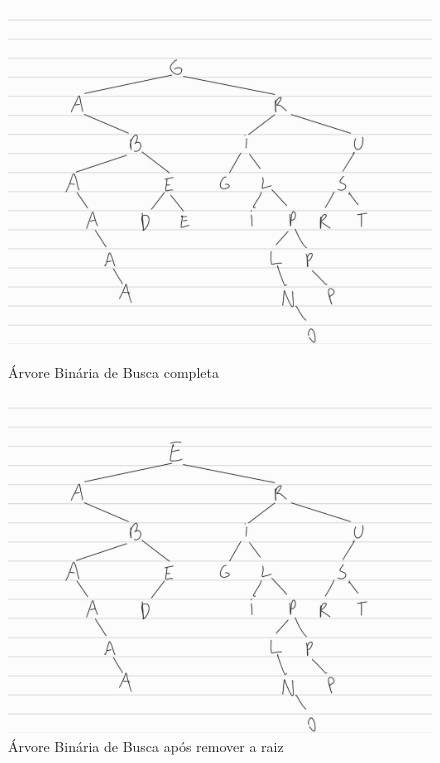 \documentclass{article}
\begin{document}
\begin{figure}[h!]
    \centering
    \begin{minipage}{0.45\linewidth}
        \centering
        \includegraphics[width=\linewidth]{arvoredebusca.jpg}
        \caption{Árvore Binária de Busca completa}
        \label{fig:arvorecompleta}
    \end{minipage}
    \hfill
    \begin{minipage}{0.45\linewidth}
        \centering
        \includegraphics[width=\linewidth]{raizremovida.jpg}
        \caption{Árvore Binária de Busca após remover a raiz}
        \label{fig:arvoresemraiz}
    \end{minipage}
\end{figure}
\end{document}
